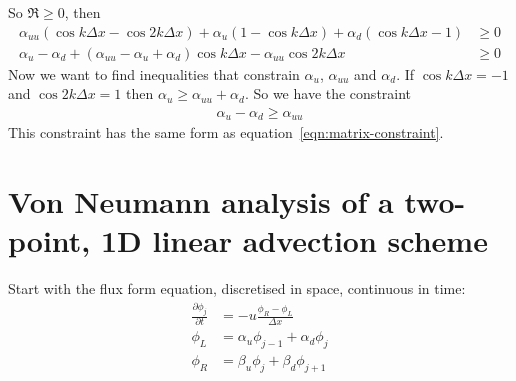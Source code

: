 \documentclass{article}
\begin{document}
So $\Re \geq 0$, then
\begin{align}
\alpha_{uu} \left( \cos k\Delta x - \cos 2k\Delta x \right) + \alpha_u \left( 1 - \cos k \Delta x \right) + \alpha_d \left( \cos k\Delta x - 1 \right) &\geq 0 \\
\alpha_u - \alpha_d + \left( \alpha_{uu} - \alpha_u + \alpha_d \right) \cos k\Delta x - \alpha_{uu} \cos 2k\Delta x &\geq 0
\end{align}
Now we want to find inequalities that constrain $\alpha_u$, $\alpha_{uu}$ and $\alpha_d$.
If $\cos k\Delta x = -1$ and $\cos 2k\Delta x = 1$ then $\alpha_u \geq \alpha_{uu} + \alpha_d$.
So we have the constraint
\begin{align}
\alpha_u - \alpha_d \geq \alpha_{uu}
\end{align}
This constraint has the same form as equation~\eqref{eqn:matrix-constraint}.

\section*{Von Neumann analysis of a two-point, 1D linear advection scheme}

Start with the flux form equation, discretised in space, continuous in time:
\begin{align}
\frac{\partial \phi_j}{\partial t} &= - u \frac{\phi_R - \phi_L}{\Delta x} \label{eqn:advection} \\
\phi_L &= \alpha_u \phi_{j-1} + \alpha_d \phi_j \\
\phi_R &= \beta_u \phi_j + \beta_d \phi_{j+1}
\end{align}
\end{document}
